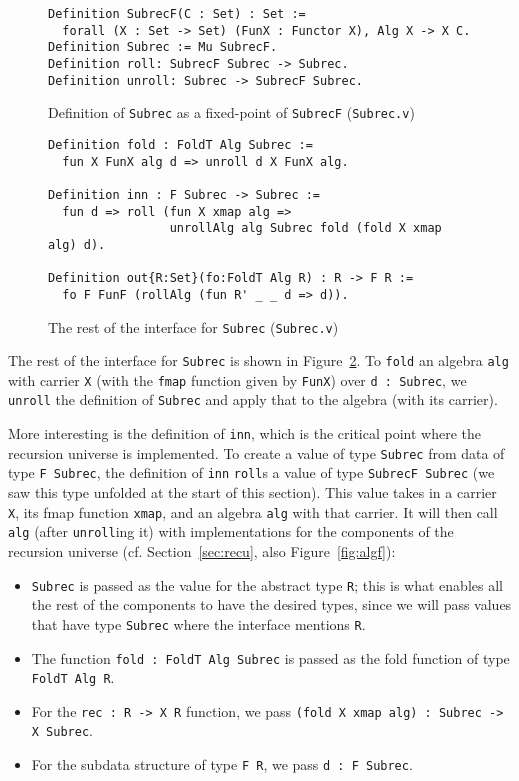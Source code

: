 \documentclass[a4paper,USenglish]{lipics-v2021}
\begin{document}
\begin{figure}
\begin{verbatim}
Definition SubrecF(C : Set) : Set :=
  forall (X : Set -> Set) (FunX : Functor X), Alg X -> X C.
Definition Subrec := Mu SubrecF.
Definition roll: SubrecF Subrec -> Subrec.
Definition unroll: Subrec -> SubrecF Subrec.
\end{verbatim}
\caption{Definition of \texttt{Subrec} as a fixed-point of \texttt{SubrecF} (\texttt{Subrec.v})}
\label{fig:subrec}
\end{figure}

\begin{figure}
\begin{verbatim}
Definition fold : FoldT Alg Subrec :=
  fun X FunX alg d => unroll d X FunX alg.

Definition inn : F Subrec -> Subrec :=
  fun d => roll (fun X xmap alg =>
                 unrollAlg alg Subrec fold (fold X xmap alg) d).

Definition out{R:Set}(fo:FoldT Alg R) : R -> F R :=
  fo F FunF (rollAlg (fun R' _ _ d => d)).
\end{verbatim}
\caption{The rest of the interface for \texttt{Subrec} (\texttt{Subrec.v})}
\label{fig:subrecb}
\end{figure}

The rest of the interface for \verb|Subrec| is shown in
Figure~\ref{fig:subrecb}.  To \verb|fold| an algebra
\verb|alg| with carrier \verb|X| (with the \verb|fmap| function given by
\verb|FunX|) over \verb|d : Subrec|, we \verb|unroll| the
definition of \verb|Subrec| and apply that to the algebra (with its
carrier).

More interesting is the definition of \verb|inn|, which is the
critical point where the recursion universe is implemented.  To create
a value of type \verb|Subrec| from data of type \verb|F Subrec|, the
definition of \verb|inn| \verb|roll|s a value of type
\verb|SubrecF Subrec| (we saw this type unfolded at the start of
this section).  This value takes in a carrier
\verb|X|, its fmap function \verb|xmap|, and an algebra \verb|alg|
with that carrier.  It will then call \verb|alg| (after \verb|unroll|ing
it) with implementations for the components of the recursion universe
(cf. Section~\ref{sec:recu}, also Figure~\ref{fig:algf}):
\begin{itemize}
\item \verb|Subrec| is passed as the value for the abstract type \verb|R|; this is what enables all
  the rest of the components to have the desired types, since we will
  pass values that have type \verb|Subrec|
  where the interface mentions \verb|R|.
\item The function \verb|fold : FoldT Alg Subrec| is passed as
  the fold function of type \verb|FoldT Alg R|.
\item For the \verb|rec : R -> X R| function, we pass \verb|(fold X xmap alg) : Subrec -> X Subrec|.
\item For the subdata structure of type \verb|F R|, we pass \verb|d : F Subrec|.
\end{itemize}
\end{document}

